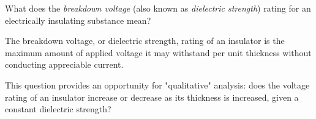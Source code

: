 

What does the {\it breakdown voltage} (also known as {\it dielectric strength}) rating for an electrically insulating substance mean?







The breakdown voltage, or dielectric strength, rating of an insulator is the maximum amount of applied voltage it may withstand per unit thickness without conducting appreciable current.







This question provides an opportunity for "qualitative" analysis: does the voltage rating of an insulator increase or decrease as its thickness is increased, given a constant dielectric strength?




